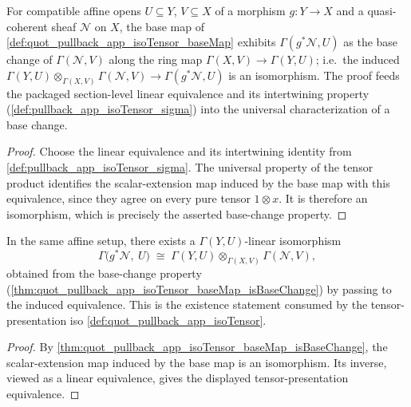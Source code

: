 \begin{theorem}\leanok
  \label{thm:quot_pullback_app_isoTensor_baseMap_isBaseChange}
  For compatible affine opens \(U \subseteq Y\), \(V \subseteq X\) of a
  morphism \(g : Y \to X\) and a quasi-coherent sheaf \(\mathcal{N}\) on
  \(X\), the base map of \cref{def:quot_pullback_app_isoTensor_baseMap}
  exhibits \(\Gamma(g^* \mathcal{N}, U)\) as the base change of
  \(\Gamma(\mathcal{N}, V)\) along the ring map
  \(\Gamma(X, V) \to \Gamma(Y, U)\); i.e.\ the induced
  \(\Gamma(Y, U) \otimes_{\Gamma(X, V)} \Gamma(\mathcal{N}, V)
   \to \Gamma(g^* \mathcal{N}, U)\) is an isomorphism. The proof feeds the
  packaged section-level linear equivalence and its intertwining property
  (\cref{def:pullback_app_isoTensor_sigma}) into the universal
  characterization of a base change.
\end{theorem}
\begin{proof}
  Choose the linear equivalence and its intertwining identity from
  \cref{def:pullback_app_isoTensor_sigma}. The universal property of the
  tensor product identifies the scalar-extension map induced by the base
  map with this equivalence, since they agree on every pure tensor
  \(1\otimes x\). It is therefore an isomorphism, which is precisely the
  asserted base-change property.
\end{proof}

\begin{theorem}\leanok
  \label{thm:quot_pullback_app_isoTensor_isBaseChange}
  In the same affine setup, there exists a \(\Gamma(Y, U)\)-linear
  isomorphism
  \[
    \Gamma\bigl(g^* \mathcal{N},\ U\bigr)
    \;\cong\;
    \Gamma(Y, U) \otimes_{\Gamma(X, V)} \Gamma(\mathcal{N}, V),
  \]
  obtained from the base-change property
  (\cref{thm:quot_pullback_app_isoTensor_baseMap_isBaseChange}) by passing to
  the induced equivalence. This is the existence statement consumed by the
  tensor-presentation iso \cref{def:quot_pullback_app_isoTensor}.
\end{theorem}
\begin{proof}
  By \cref{thm:quot_pullback_app_isoTensor_baseMap_isBaseChange}, the
  scalar-extension map induced by the base map is an isomorphism. Its
  inverse, viewed as a linear equivalence, gives the displayed
  tensor-presentation equivalence.
\end{proof}

